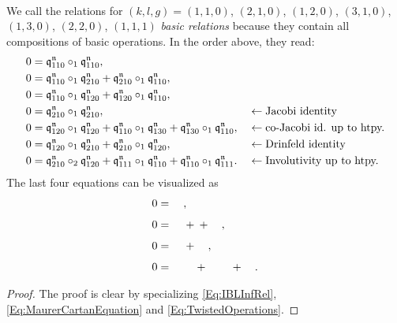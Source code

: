 \documentclass[\MainFolder/Text.tex]{subfiles}
\begin{document}
\begin{Proposition}
\begin{equation}
\begin{aligned}
\end{aligned}
\end{equation}
We call the relations for $(k,l,g) = (1,1,0)$, $(2,1,0)$, $(1,2,0)$, $(3,1,0)$, $(1,3,0)$, $(2,2,0)$, $(1,1,1)$ \emph{basic relations} because they contain all compositions of basic operations. In the order above, they read:
$$\begin{aligned} 
 0 & =\mathfrak{q}^{\mathfrak{n}}_{110} \circ_1 \mathfrak{q}^{\mathfrak{n}}_{110}, && \\
0 &=\mathfrak{q}^{\mathfrak{n}}_{110}\circ_1\mathfrak{q}^{\mathfrak{n}}_{210} + \mathfrak{q}^{\mathfrak{n}}_{210}\circ_1 \mathfrak{q}^{\mathfrak{n}}_{110}, && \\
0 &= \mathfrak{q}^{\mathfrak{n}}_{110}\circ_1 \mathfrak{q}^{\mathfrak{n}}_{120} + \mathfrak{q}^{\mathfrak{n}}_{120}\circ_1 \mathfrak{q}^{\mathfrak{n}}_{110}, && \\
0 &= \mathfrak{q}^{\mathfrak{n}}_{210} \circ_1 \mathfrak{q}^{\mathfrak{n}}_{210}, && \leftarrow\text{Jacobi identity} \\
0 &=\mathfrak{q}^{\mathfrak{n}}_{120} \circ_1 \mathfrak{q}^{\mathfrak{n}}_{120} + \mathfrak{q}^{\mathfrak{n}}_{110}\circ_1 \mathfrak{q}^{\mathfrak{n}}_{130} + \mathfrak{q}^{\mathfrak{n}}_{130}\circ_1 \mathfrak{q}^{\mathfrak{n}}_{110}, && \leftarrow\text{co-Jacobi id. up to htpy.} \\
0 & = \mathfrak{q}^{\mathfrak{n}}_{120}\circ_1 \mathfrak{q}^{\mathfrak{n}}_{210} + \mathfrak{q}^{\mathfrak{n}}_{210}\circ_1 \mathfrak{q}^{\mathfrak{n}}_{120}, && \leftarrow\text{Drinfeld identity} \\
0 & = \mathfrak{q}^{\mathfrak{n}}_{210}\circ_2 \mathfrak{q}^{\mathfrak{n}}_{120} + \mathfrak{q}^{\mathfrak{n}}_{111}\circ_1 \mathfrak{q}^{\mathfrak{n}}_{110} + \mathfrak{q}^{\mathfrak{n}}_{110}\circ_1 \mathfrak{q}^{\mathfrak{n}}_{111}. && \leftarrow\text{Involutivity up to htpy.}
\end{aligned}$$
The last four equations can be visualized as
{ \begingroup \allowdisplaybreaks
\def\dist{0.25} %
  \def\rad{0.4} %
  \def\ecc{0.1} %
  \def\hght{1} %
  \def\dif{1.1} %
  \def\difbig{1.5*\dif} %
  \def\radO{\rad} %
  \def\eccO{\ecc} %
  \def\hghtO{2*\hght+\dist} %
  \def\difO{\dif} %
  \def\gencanc{0.05} %
  \def\genecc{20} %
  \def\genrad{0.3} %
\begin{align*}
0 & =\quad\vcenterline{}, \\[1ex] 
0&=\quad \vcenterline{}+
\vcenterline{}
+\quad\vcenterline{}, \\[1ex] 
0&=\quad \vcenterline{}+\quad\vcenterline{},\\[1ex]
0& =\quad \vcenterline{}\quad+\quad\vcenterline{}\quad+\quad\vcenterline{}.
\end{align*}
\endgroup}
\end{Proposition}
\begin{proof}
The proof is clear by specializing \eqref{Eq:IBLInfRel}, \eqref{Eq:MaurerCartanEquation} and \eqref{Eq:TwistedOperations}.
\end{proof}
\end{document}
